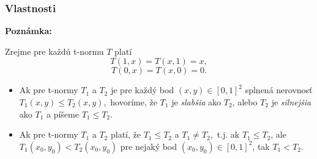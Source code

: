 \documentclass{beamer}
\begin{document}
\begin{frame}
\frametitle{Vlastnosti}
\textbf{Poznámka:}
\begin{center}
Zrejme pre každú t-normu $T$ platí
$$ T(1,x)=T(x,1)=x,$$
$$ T(0,x)=T(x,0)=0.$$
\end{center}
\begin{definition}


\begin{itemize}
\item  Ak pre t-normy $T_1$ a $T_2$ je
pre každý bod $(x,y) \in [0,1]^2$ splnená nerovnosť
$T_1(x,y) \leq T_2(x,y),$ hovoríme, že $T_1$ je {\em slabšia} ako $T_2$,
alebo $T_2$ je {\em silnejšia} ako $T_1$ a píšeme $T_1\leq T_2$.
\item  Ak pre t-normy $T_1$ a $T_2$ platí, že $T_1 \leq T_2$ a
$T_1 \ne T_2,$ t.j. ak $T_1 \leq T_2$, ale $T_1(x_0,y_0) <
T_2(x_0,y_0)$ pre nejaký bod $(x_0,y_0) \in [0,1]^2$, tak $T_1<T_2$.
\end{itemize}
\end{definition}
\end{frame}
\end{document}
